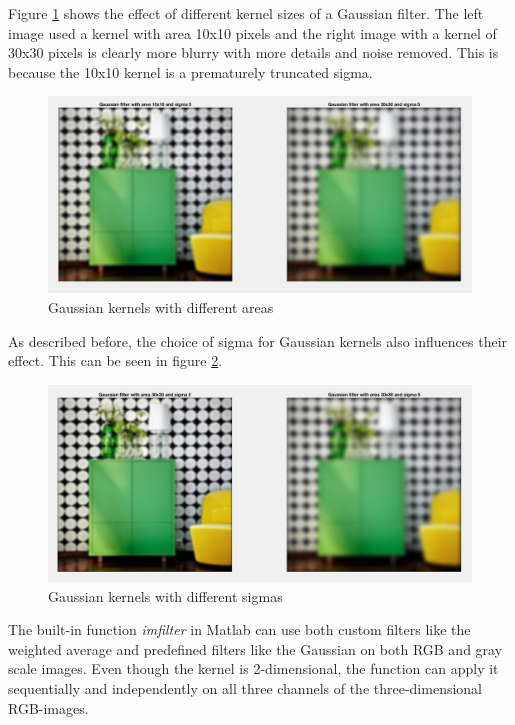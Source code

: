 Figure \ref{fig:task13} shows the effect of different kernel sizes of a Gaussian filter. The left image used a kernel with area 10x10 pixels and the right image with a kernel of 30x30 pixels is clearly more blurry with more details and noise removed. This is because the 10x10 kernel is a prematurely truncated sigma.

\begin{figure}[!hbt]
  \includegraphics[width=\textwidth]{./img/task13.png}
  \caption{Gaussian kernels with different areas}
  \label{fig:task13}
\end{figure}

As described before, the choice of sigma for Gaussian kernels also influences their effect. This can be seen in figure \ref{fig:task14}.

\begin{figure}[!hbt]
  \includegraphics[width=\textwidth]{./img/task14.png}
  \caption{Gaussian kernels with different sigmas}
  \label{fig:task14}
\end{figure}

The built-in function \textit{imfilter} in Matlab can use both custom filters like the weighted average and predefined filters like the Gaussian on both RGB and gray scale images. Even though the kernel is 2-dimensional, the function can apply it sequentially and independently on all three channels of the three-dimensional RGB-images.

